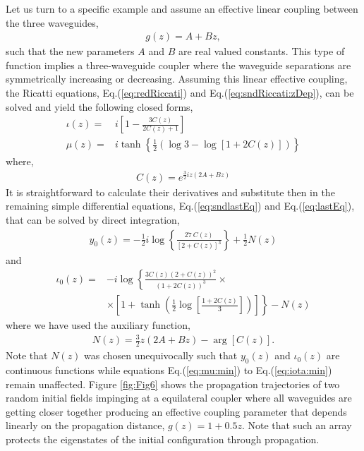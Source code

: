 \documentclass[9pt,twocolumn,twoside]{osajnl}
\begin{document}
Let us turn to a specific example and assume an effective linear coupling between the three waveguides, 
\begin{eqnarray}
g(z) = A + B z,
\end{eqnarray}
such that the new parameters $A$ and $B$ are real valued constants.
This type of function implies a three-waveguide coupler where the waveguide separations are symmetrically increasing or decreasing. 
Assuming this linear effective coupling, the Ricatti equations, Eq.(\ref{eq:redRiccati}) and  Eq.(\ref{eq:sndRiccati:zDep}), can be solved and yield the following closed forms,
\begin{align}
\iota(z)=& i\left[1-\frac{3 C(z)}{2 C(z) + 1}\right] \\
\mu(z)=& i \tanh \left\{ \frac{1}{2} \left(\log 3 - \log
\left[ 1 + 2 C(z)\right] \right) \right\}
\end{align}
where,
\begin{eqnarray}
C(z) = e^{\frac{3}{2} i z (2 A+B z)}
\end{eqnarray}
It is straightforward to calculate their derivatives and substitute then in the remaining simple differential equations, Eq.(\ref{eq:sndlastEq}) and Eq.(\ref{eq:lastEq}), that can be solved by direct integration,
\begin{eqnarray}
y_0(z)=
-\frac{1}{2} i \log \left\{  \frac{27 ~ C(z)}{\left[ 2+ C(z)\right]^3} \right\} + \frac{1}{2}N(z)
\end{eqnarray}
and 
\begin{align}
\iota_0(z)=& -i \log \left\{ \frac{3 C(z) \left(2+C(z)\right)^2}{\left(1+2 C(z)\right)^3} \right. \times \nonumber\\
& \times \left. \left[ 1 + \tanh \left( \frac{1}{2} \log \left[ \frac{ 1 + 2 C(z)}{3}  \right] \right) \right] \right\} - N(z)
\end{align}
where we have used the auxiliary function, 
\begin{eqnarray}
N(z)= \frac{3}{2} z (2 A+B z)-\arg\left[C(z)\right].
\end{eqnarray}
Note that $N(z)$ was chosen unequivocally such that $y_0(z)$ and $\iota_0(z)$ are continuous functions while equations Eq.(\ref{eq:mu:min}) to Eq.(\ref{eq:iota:min}) remain 
unaffected. 
Figure \ref{fig:Fig6} shows the propagation trajectories of two random initial fields impinging at a equilateral coupler where all waveguides are getting closer together producing an effective coupling parameter that depends linearly on the propagation distance, $g(z) = 1 +0.5 z$.
Note that such an array protects the eigenstates of the initial configuration through propagation.
\end{document}
